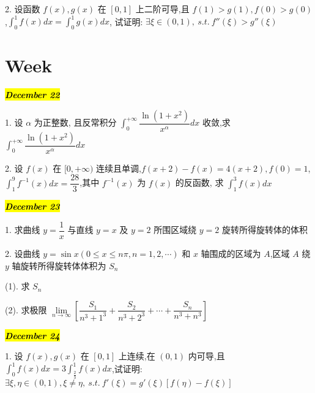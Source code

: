 2. 设函数 $f(x),g(x)$ 在 $[0,1]$ 上二阶可导,且 $f(1)>g(1),f(0)>g(0)$,$\displaystyle{\int_{0}^{1}f(x)dx=\int_{0}^{1}g(x)dx}$, 试证明: $\exists \xi\in(0,1),\ s.t.\ f''(\xi)>g''(\xi)$
\begin{solution}
	
\end{solution}

\section{Week }
\hl{\textbf{\textit{December 22}}}

1. 设 $\alpha$ 为正整数, 且反常积分 $\displaystyle{\int_{0}^{+\infty}\dfrac{\ln(1+x^{2})}{x^{\alpha}}dx}$ 收敛,求 $\displaystyle{\int_{0}^{+\infty}\dfrac{\ln(1+x^{2})}{x^{\alpha}}dx}$
\begin{solution}
	
\end{solution}

2. 设 $f(x)$ 在 $[0,+\infty)$ 连续且单调,$f(x+2)-f(x)=4(x+2),f(0)=1$,$\displaystyle{\int_{1}^{9}f^{-1}(x)dx=\dfrac{28}{3}}$,其中 $f^{-1}(x)$ 为 $f(x)$ 的反函数,
求 $\displaystyle{\int_{1}^{3}f(x)dx}$
\begin{solution}
	
\end{solution}

\hl{\textbf{\textit{December 23}}}

1. 求曲线 $y=\dfrac{1}{x}$ 与直线 $y=x$ 及 $y=2$ 所围区域绕 $y=2$ 旋转所得旋转体的体积
\begin{solution}
	
\end{solution}

2. 设曲线 $y=\sin x(0\leq x\leq n\pi,n=1,2,\cdots)$ 和 $x$ 轴围成的区域为 $A$,区域 $A$ 绕 $y$ 轴旋转所得旋转体体积为 $S_{n}$

(1). 求 $S_{n}$

(2). 求极限 $\lim\limits_{n\to\infty}[\dfrac{S_{1}}{n^{3}+1^{3}}+\dfrac{S_{2}}{n^{3}+2^{3}}+\cdots+\dfrac{S_{n}}{n^{3}+n^{3}}]$
\begin{solution}
	
\end{solution}

\hl{\textbf{\textit{December 24}}}

1. 设 $f(x),g(x)$ 在 $[0,1]$ 上连续,在 $(0,1)$ 内可导,且 $\displaystyle{\int_{0}^{1}f(x)dx=3\int_{\frac{2}{3}}^{1}f(x)dx}$,试证明:$\exists \xi,\eta\in(0,1),\xi\neq \eta,\ s.t.\ f'(\xi)=g'(\xi)[f(\eta)-f(\xi)]$
\begin{solution}
	
\end{solution}

